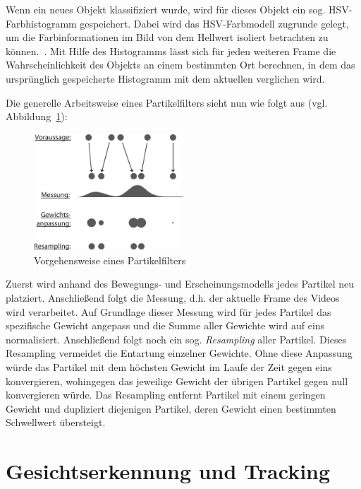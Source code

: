 \documentclass[a4paper, 11pt, twocolumn]{article}
\begin{document}
Wenn ein neues Objekt klassifiziert wurde, wird für dieses Objekt ein sog. HSV-Farbhistogramm gespeichert. Dabei wird das HSV-Farbmodell zugrunde gelegt, um die Farbinformationen im Bild von dem Hellwert isoliert betrachten zu können.~\cite{HueVermaak2002}. Mit Hilfe des Histogramms lässt sich für jeden weiteren Frame die Wahrscheinlichkeit des Objekts an einem bestimmten Ort berechnen, in dem das ursprünglich gespeicherte Histogramm mit dem aktuellen verglichen wird.


Die generelle Arbeitsweise eines Partikelfilters sieht nun wie folgt aus (vgl. Abbildung~\ref{fig:pfiltervisualisierung}):

 \begin{figure}
	\centering
	\includegraphics[width=0.5\textwidth]{pfvis.eps}
	\caption{Vorgehensweise eines Partikelfilters}
	\label{fig:pfiltervisualisierung}
\end{figure}

Zuerst wird anhand des Bewegungs- und Erscheinungsmodells jedes Partikel neu platziert. Anschließend folgt die Messung, d.h. der aktuelle Frame des Videos wird verarbeitet. Auf Grundlage dieser Messung wird für jedes Partikel das spezifische Gewicht angepass und die Summe aller Gewichte wird auf eins normalisiert. Anschließend folgt noch ein sog. \emph{Resampling} aller Partikel. Dieses Resampling vermeidet die Entartung einzelner Gewichte. Ohne diese Anpassung würde das Partikel mit dem höchsten Gewicht im Laufe der Zeit gegen eins konvergieren, wohingegen das jeweilige Gewicht der übrigen Partikel gegen null konvergieren würde. Das Resampling entfernt Partikel mit einem geringen Gewicht und dupliziert diejenigen Partikel, deren Gewicht einen bestimmten Schwellwert übersteigt.


\section{Gesichtserkennung und Tracking} %
\label{sec:gesichtserkennung_und_tracking}
\end{document}
